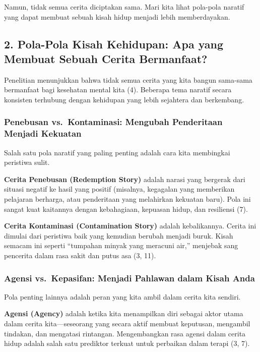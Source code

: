 \documentclass[
  letterpaper,
  DIV=11,
  numbers=noendperiod]{scrreprt}
\begin{document}
Namun, tidak semua cerita diciptakan sama. Mari kita lihat pola-pola
naratif yang dapat membuat sebuah kisah hidup menjadi lebih
memberdayakan.

\subsection{\texorpdfstring{\textbf{2. Pola-Pola Kisah Kehidupan: Apa
yang Membuat Sebuah Cerita
Bermanfaat?}}{2. Pola-Pola Kisah Kehidupan: Apa yang Membuat Sebuah Cerita Bermanfaat?}}\label{pola-pola-kisah-kehidupan-apa-yang-membuat-sebuah-cerita-bermanfaat}

Penelitian menunjukkan bahwa tidak semua cerita yang kita bangun
sama-sama bermanfaat bagi kesehatan mental kita (4). Beberapa tema
naratif secara konsisten terhubung dengan kehidupan yang lebih sejahtera
dan berkembang.

\subsubsection{Penebusan vs.~Kontaminasi: Mengubah Penderitaan Menjadi
Kekuatan}\label{penebusan-vs.-kontaminasi-mengubah-penderitaan-menjadi-kekuatan}

Salah satu pola naratif yang paling penting adalah cara kita membingkai
peristiwa sulit.

\textbf{Cerita Penebusan (Redemption Story)} adalah narasi yang bergerak
dari situasi negatif ke hasil yang positif (misalnya, kegagalan yang
memberikan pelajaran berharga, atau penderitaan yang melahirkan kekuatan
baru). Pola ini sangat kuat kaitannya dengan kebahagiaan, kepuasan
hidup, dan resiliensi (7).

\textbf{Cerita Kontaminasi (Contamination Story)} adalah kebalikannya.
Cerita ini dimulai dari peristiwa baik yang kemudian berubah menjadi
buruk. Kisah semacam ini seperti ``tumpahan minyak yang meracuni air,''
menjebak sang pencerita dalam rasa sakit dan putus asa (3, 11).

\subsubsection{Agensi vs.~Kepasifan: Menjadi Pahlawan dalam Kisah
Anda}\label{agensi-vs.-kepasifan-menjadi-pahlawan-dalam-kisah-anda}

Pola penting lainnya adalah peran yang kita ambil dalam cerita kita
sendiri.

\textbf{Agensi (Agency)} adalah ketika kita menampilkan diri sebagai
aktor utama dalam cerita kita---seseorang yang secara aktif membuat
keputusan, mengambil tindakan, dan mengatasi rintangan. Mengembangkan
rasa agensi dalam cerita hidup adalah salah satu prediktor terkuat untuk
perbaikan dalam terapi (3, 7).
\end{document}

